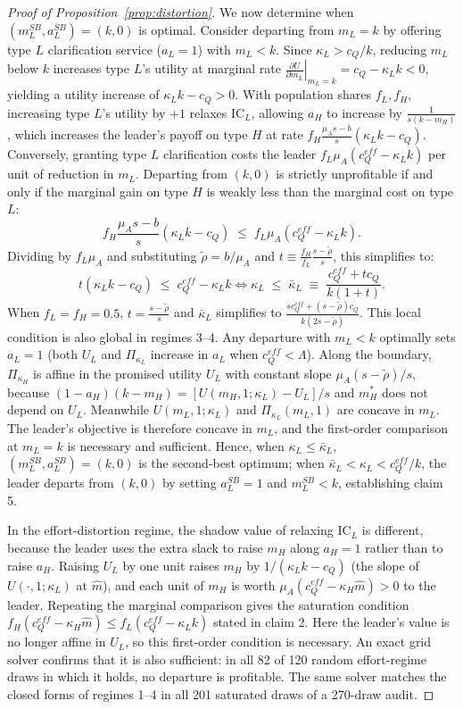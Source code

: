 \documentclass[11pt]{article}
\begin{document}
\begin{proof}[Proof of Proposition~\ref{prop:distortion}]
We now determine when $(m_L^{SB}, a_L^{SB}) = (k, 0)$ is optimal.
Consider departing from $m_L = k$ by offering type $L$ clarification service ($a_L = 1$) with $m_L < k$. Since $\kappa_L > c_Q/k$, reducing $m_L$ below $k$ increases type $L$'s utility at marginal rate $\left.\frac{\partial U}{\partial m_L}\right|_{m_L = k} = c_Q - \kappa_L k < 0$, yielding a utility increase of $\kappa_L k - c_Q > 0$.
With population shares $f_L, f_H$, increasing type $L$'s utility by $+1$ relaxes $\text{IC}_L$, allowing $a_H$ to increase by $\frac{1}{s(k - m_H)}$, which increases the leader's payoff on type $H$ at rate $f_H \frac{\mu_A s - b}{s}(\kappa_L k - c_Q)$.
Conversely, granting type $L$ clarification costs the leader $f_L \mu_A(c_Q^{eff} - \kappa_L k)$ per unit of reduction in $m_L$.
Departing from $(k, 0)$ is strictly unprofitable if and only if the marginal gain on type $H$ is weakly less than the marginal cost on type $L$:
\[
f_H \frac{\mu_A s - b}{s}(\kappa_L k - c_Q) \;\le\; f_L \mu_A(c_Q^{eff} - \kappa_L k).
\]
Dividing by $f_L \mu_A$ and substituting $\tilde\rho = b/\mu_A$ and $t \equiv \frac{f_H}{f_L}\frac{s - \tilde\rho}{s}$, this simplifies to:
\[
t(\kappa_L k - c_Q) \;\le\; c_Q^{eff} - \kappa_L k \iff \kappa_L \;\le\; \bar\kappa_L \;\equiv\; \frac{c_Q^{eff} + t c_Q}{k(1 + t)}.
\]
When $f_L = f_H = 0.5$, $t = \frac{s - \tilde\rho}{s}$ and $\bar\kappa_L$ simplifies to $\frac{s c_Q^{eff} + (s - \tilde\rho)c_Q}{k(2s - \tilde\rho)}$.
This local condition is also global in regimes 3--4. Any departure with $m_L < k$ optimally sets $a_L = 1$ (both $U_L$ and $\Pi_{\kappa_L}$ increase in $a_L$ when $c_Q^{eff} < \Lambda$). Along the boundary, $\Pi_{\kappa_H}$ is affine in the promised utility $U_L$ with constant slope $\mu_A(s - \tilde\rho)/s$, because $(1 - a_H)(k - m_H) = [U(m_H,1;\kappa_L) - U_L]/s$ and $m_H^*$ does not depend on $U_L$. Meanwhile $U(m_L,1;\kappa_L)$ and $\Pi_{\kappa_L}(m_L,1)$ are concave in $m_L$. The leader's objective is therefore concave in $m_L$, and the first-order comparison at $m_L = k$ is necessary and sufficient. Hence, when $\kappa_L \le \bar\kappa_L$, $(m_L^{SB}, a_L^{SB}) = (k, 0)$ is the second-best optimum; when $\bar\kappa_L < \kappa_L < c_Q^{eff}/k$, the leader departs from $(k, 0)$ by setting $a_L^{SB} = 1$ and $m_L^{SB} < k$, establishing claim 5.

In the effort-distortion regime, the shadow value of relaxing $\text{IC}_L$ is different, because the leader uses the extra slack to raise $m_H$ along $a_H = 1$ rather than to raise $a_H$. Raising $U_L$ by one unit raises $m_H$ by $1/(\kappa_L k - c_Q)$ (the slope of $U(\cdot,1;\kappa_L)$ at $\hat m$), and each unit of $m_H$ is worth $\mu_A(c_Q^{eff} - \kappa_H \hat m) > 0$ to the leader. Repeating the marginal comparison gives the saturation condition $f_H(c_Q^{eff} - \kappa_H \hat m) \le f_L(c_Q^{eff} - \kappa_L k)$ stated in claim 2. Here the leader's value is no longer affine in $U_L$, so this first-order condition is necessary. An exact grid solver confirms that it is also sufficient: in all 82 of 120 random effort-regime draws in which it holds, no departure is profitable. The same solver matches the closed forms of regimes 1--4 in all 201 saturated draws of a 270-draw audit.


\end{proof}
\end{document}
